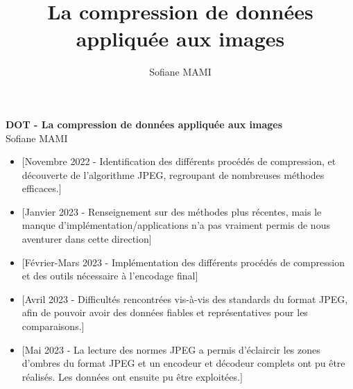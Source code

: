 \documentclass[a4paper, 11pt]{article}
\author{Sofiane MAMI}
\title{La compression de donn\'ees appliqu\'ee aux images}
\let\cite=\supercite
\begin{document}
    
\begin{center}
    {\textbf {\LARGE DOT - La compression de donn\'ees appliqu\'ee aux images}} \\
    \vspace{3mm}
    {\small Sofiane MAMI}
\end{center}

\vspace{5mm}

\begin{itemize}
    \item $\bigl[$Novembre 2022 - Identification des différents procédés de compression, et découverte de l'algorithme JPEG, regroupant de nombreuses méthodes efficaces.$\bigr]$
    \item $\bigl[$Janvier 2023 - Renseignement sur des méthodes plus récentes, mais le manque d'implémentation/applications n'a pas vraiment permis de nous aventurer dans cette direction$\bigr]$
    \item $\bigl[$Février-Mars 2023 - Implémentation des différents procédés de compression et des outils nécessaire à l'encodage final$\bigr]$
    \item $\bigl[$Avril 2023 - Difficultés rencontrées vis-à-vis des standards du format JPEG, afin de pouvoir avoir des données fiables et représentatives pour les comparaisons.$\bigr]$
    \item $\bigl[$Mai 2023 - La lecture des normes JPEG \cite{jpegStd} a permis d'éclaircir les zones d'ombres du format JPEG et un encodeur et décodeur complets ont pu être réalisés. Les données ont ensuite pu être exploitées.$\bigr]$
\end{itemize}

\printbibliography[title=Références bibliographiques]
\end{document}
